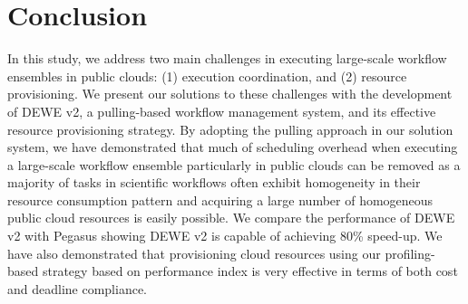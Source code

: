 \chapter{Conclusion}
\label{chapter:conclusion}

In this study, we address two main challenges in executing large-scale workflow ensembles in public clouds: (1) execution coordination, and (2) resource provisioning. We present our solutions to these challenges with the development of DEWE v2, a pulling-based workflow management system, and its effective resource provisioning strategy. 
By adopting the pulling approach in our solution system, we have demonstrated that much of scheduling overhead when executing a large-scale workflow ensemble particularly in public clouds can be removed as a majority of tasks in scientific workflows often exhibit homogeneity in their resource consumption pattern and acquiring a large number of homogeneous public cloud resources is easily possible. We compare the performance of DEWE v2 with Pegasus showing DEWE v2 is capable of achieving 80\% speed-up. We have also demonstrated that provisioning cloud resources using our profiling-based strategy based on performance index is very effective in terms of both cost and deadline compliance.


